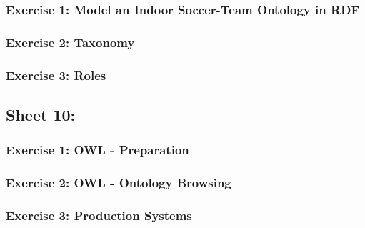 \documentclass{article}
\begin{document}
        \subsubsection{Exercise 1: Model an Indoor Soccer-Team Ontology in RDF}
        \subsubsection{Exercise 2: Taxonomy}
        \subsubsection{Exercise 3: Roles}
    \subsection{Sheet 10:}
        \subsubsection{Exercise 1: OWL - Preparation}
        \subsubsection{Exercise 2: OWL - Ontology Browsing}
        \subsubsection{Exercise 3: Production Systems}
    
        
    
    
    
    
    
    
    
    
    
    
    
    
    
    
\end{document}
